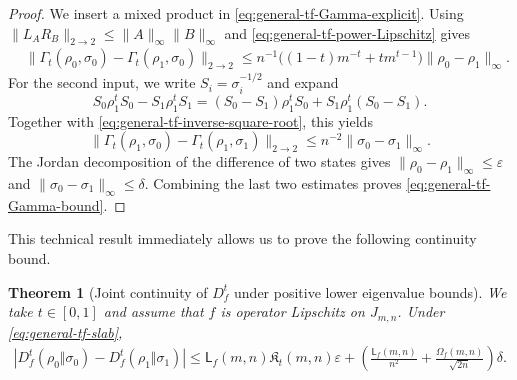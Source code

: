 \documentclass[11pt]{article}
\newtheorem{theorem}[theorem]{Theorem}
\theoremstyle{remark}
\newcommand{\1}{\mathbbm{1}}
\begin{document}
\begin{proof}
We insert a mixed product in \eqref{eq:general-tf-Gamma-explicit}.
Using $\lVert L_AR_B\rVert_{2\to2}
\leq\lVert A\rVert_\infty\lVert B\rVert_\infty$ and
\eqref{eq:general-tf-power-Lipschitz} gives
\begin{equation}
 \begin{aligned}
 &\lVert\Gamma_t(\rho_0,\sigma_0)
       -\Gamma_t(\rho_1,\sigma_0)\rVert_{2\to2}\leq n^{-1}\bigl((1-t)m^{-t}+tm^{t-1}\bigr)
       \lVert\rho_0-\rho_1\rVert_\infty.
 \end{aligned}
 \label{eq:general-tf-first-input-Gamma}
\end{equation}
For the second input, we write $S_i=\sigma_i^{-1/2}$ and expand
\begin{equation}
 S_0\rho_1^tS_0-S_1\rho_1^tS_1
 =(S_0-S_1)\rho_1^tS_0
 +S_1\rho_1^t(S_0-S_1).
\end{equation}
Together with \eqref{eq:general-tf-inverse-square-root}, this yields
\begin{equation}
 \lVert\Gamma_t(\rho_1,\sigma_0)
       -\Gamma_t(\rho_1,\sigma_1)\rVert_{2\to2}
 \leq n^{-2}\lVert\sigma_0-\sigma_1\rVert_\infty.
 \label{eq:general-tf-second-input-Gamma}
\end{equation}
The Jordan decomposition of the difference of two states gives
$\lVert\rho_0-\rho_1\rVert_\infty\leq\varepsilon$ and
$\lVert\sigma_0-\sigma_1\rVert_\infty\leq\delta$.
Combining the last two estimates proves
\eqref{eq:general-tf-Gamma-bound}.
\end{proof}

This technical result immediately allows us to prove the following continuity bound.

\begin{theorem}[Joint continuity of $D_f^t$ under positive lower
eigenvalue bounds]
\label{theo:joint-slab-general-tf}
We take $t\in[0,1]$ and assume that $f$ is operator Lipschitz on
$J_{m,n}$.  Under \eqref{eq:general-tf-slab},
\begin{equation}
 \boxed{\begin{aligned}
 \left|D_f^t(\rho_0\Vert\sigma_0)
       -D_f^t(\rho_1\Vert\sigma_1)\right|\leq
 \mathsf L_f(m,n)\mathfrak K_t(m,n)\varepsilon
 +\left(\frac{\mathsf L_f(m,n)}{n^2}
       +\frac{\Omega_f(m,n)}{\sqrt{2n}}\right)\delta.
 \end{aligned}}
 \label{eq:joint-slab-general-tf-bound}
\end{equation}
\end{theorem}
\end{document}
